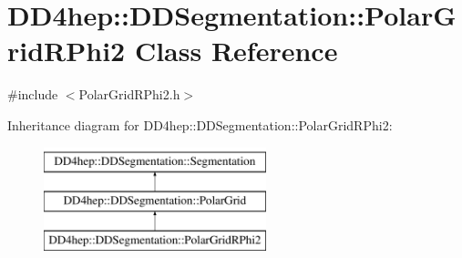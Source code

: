 \hypertarget{class_d_d4hep_1_1_d_d_segmentation_1_1_polar_grid_r_phi2}{}\section{D\+D4hep\+:\+:D\+D\+Segmentation\+:\+:Polar\+Grid\+R\+Phi2 Class Reference}
\label{class_d_d4hep_1_1_d_d_segmentation_1_1_polar_grid_r_phi2}


{\ttfamily \#include $<$Polar\+Grid\+R\+Phi2.\+h$>$}

Inheritance diagram for D\+D4hep\+:\+:D\+D\+Segmentation\+:\+:Polar\+Grid\+R\+Phi2\+:\begin{figure}[H]
\begin{center}
\leavevmode
\includegraphics[height=3.000000cm]{class_d_d4hep_1_1_d_d_segmentation_1_1_polar_grid_r_phi2}
\end{center}
\end{figure}
